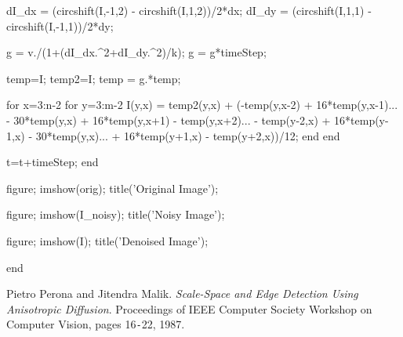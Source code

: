 \documentclass[12pt]{article}
\begin{document}
\begin{verbatimtab}
        dI_dx = (circshift(I,-1,2) - circshift(I,1,2))/2*dx;
        dI_dy = (circshift(I,1,1) - circshift(I,-1,1))/2*dy;

        g = v./(1+(dI_dx.^2+dI_dy.^2)/k);
        g = g*timeStep;
        
        
        temp=I;%
        temp2=I;%
        temp = g.*temp;%
        
        for x=3:n-2
            for y=3:m-2
                I(y,x) = temp2(y,x) + (-temp(y,x-2) + 16*temp(y,x-1)...
                        - 30*temp(y,x) + 16*temp(y,x+1) - temp(y,x+2)...
                        - temp(y-2,x) + 16*temp(y-1,x) - 30*temp(y,x)...
                        + 16*temp(y+1,x) - temp(y+2,x))/12;
            end
        end
        
        t=t+timeStep;
    end
    
    figure;
    imshow(orig);
    title('Original Image');

    figure;
    imshow(I_noisy);
    title('Noisy Image');
    
    figure;
    imshow(I);
    title('Denoised Image');

end

\end{verbatimtab}
\newpage
\clearpage

\begin{thebibliography}{9}
Pietro Perona and Jitendra Malik.
\textit{Scale-Space and Edge Detection Using Anisotropic Diffusion}. 
Proceedings of IEEE Computer Society Workshop on Computer Vision, pages 16\texttt{-}22, 1987.
\end{thebibliography}

\setcounter{page}{1} \pagestyle{empty}


\end{document}
